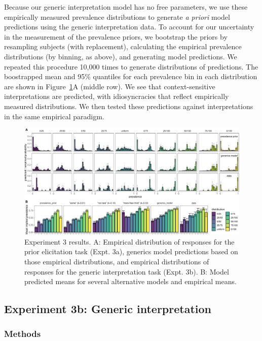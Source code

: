 \documentclass[,man,floatsintext]{apa6}
\theoremstyle{definition}
\theoremstyle{definition}
\theoremstyle{definition}
\theoremstyle{remark}
\begin{document}
Because our generic interpretation model has no free parameters, we use
these empirically measured prevalence distributions to generate \emph{a
priori} model predictions using the generic interpretation data. To
account for our uncertainty in the measurement of the prevalence priors,
we bootstrap the priors by resampling subjects (with replacement),
calculating the empirical prevalence distributions (by binning, as
above), and generating model predictions. We repeated this procedure
10,000 times to generate distributions of predictions. The boostrapped
mean and 95\% quantiles for each prevalence bin in each distribution are
shown in Figure~\ref{fig:priorManipulationResults}A (middle row). We see
that context-sensitive interpretations are predicted, with
idiosyncracies that reflect empirically measured distributions. We then
tested these predictions against interpretations in the same empirical
paradigm.

\begin{figure}
\centering
\includegraphics{genint_files/figure-latex/priorManipulationResults-1.pdf}
\caption{\label{fig:priorManipulationResults}Experiment 3 results. A:
Empirical distribution of responses for the prior elicitation task
(Expt. 3a), generics model predictions based on those empirical
distributions, and empirical distributions of responses for the generic
interpretation task (Expt. 3b). B: Model predicted means for several
alternative models and empirical means.}
\end{figure}

\hypertarget{experiment-3b-generic-interpretation}{%
\subsection{Experiment 3b: Generic
interpretation}\label{experiment-3b-generic-interpretation}}

\hypertarget{methods-3}{%
\subsubsection{Methods}\label{methods-3}}
\end{document}
